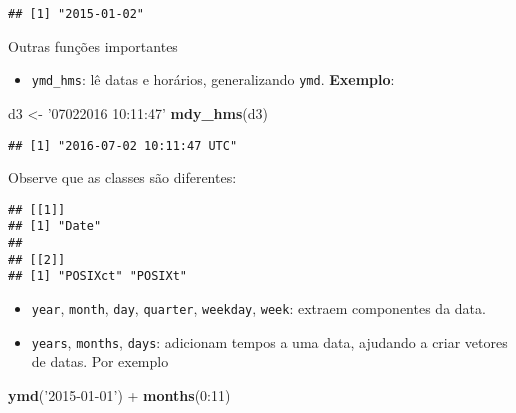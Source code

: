 \documentclass[]{book}
\newenvironment{Shaded}{\begin{snugshade}}{\end{snugshade}}
\newcommand{\KeywordTok}[1]{\textcolor[rgb]{0.13,0.29,0.53}{\textbf{{#1}}}}
\newcommand{\DecValTok}[1]{\textcolor[rgb]{0.00,0.00,0.81}{{#1}}}
\newcommand{\StringTok}[1]{\textcolor[rgb]{0.31,0.60,0.02}{{#1}}}
\newcommand{\NormalTok}[1]{{#1}}
\providecommand{\tightlist}{%
  \setlength{\itemsep}{0pt}\setlength{\parskip}{0pt}}
\begin{document}
\begin{verbatim}
## [1] "2015-01-02"
\end{verbatim}

Outras funções importantes

\begin{itemize}
\tightlist
\item
  \texttt{ymd\_hms}: lê datas e horários, generalizando \texttt{ymd}.
  \textbf{Exemplo}:
\end{itemize}

\begin{Shaded}
\begin{Highlighting}[]
\NormalTok{d3 <-}\StringTok{ '07022016 10:11:47'}
\KeywordTok{mdy_hms}\NormalTok{(d3)}
\end{Highlighting}
\end{Shaded}

\begin{verbatim}
## [1] "2016-07-02 10:11:47 UTC"
\end{verbatim}

Observe que as classes são diferentes:

\begin{Shaded}
\end{Shaded}

\begin{verbatim}
## [[1]]
## [1] "Date"
## 
## [[2]]
## [1] "POSIXct" "POSIXt"
\end{verbatim}

\begin{itemize}
\tightlist
\item
  \texttt{year}, \texttt{month}, \texttt{day}, \texttt{quarter},
  \texttt{weekday}, \texttt{week}: extraem componentes da data.
\item
  \texttt{years}, \texttt{months}, \texttt{days}: adicionam tempos a uma
  data, ajudando a criar vetores de datas. Por exemplo
\end{itemize}

\begin{Shaded}
\begin{Highlighting}[]
\KeywordTok{ymd}\NormalTok{(}\StringTok{'2015-01-01'}\NormalTok{) +}\StringTok{ }\KeywordTok{months}\NormalTok{(}\DecValTok{0}\NormalTok{:}\DecValTok{11}\NormalTok{)}
\end{Highlighting}
\end{Shaded}
\end{document}
